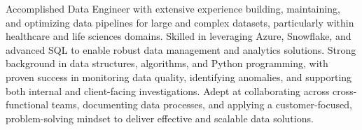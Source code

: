 \begin{onecolentry}
    Accomplished Data Engineer with extensive experience building, maintaining, and optimizing data pipelines for large and complex datasets, particularly within healthcare and life sciences domains. Skilled in leveraging Azure, Snowflake, and advanced SQL to enable robust data management and analytics solutions. Strong background in data structures, algorithms, and Python programming, with proven success in monitoring data quality, identifying anomalies, and supporting both internal and client-facing investigations. Adept at collaborating across cross-functional teams, documenting data processes, and applying a customer-focused, problem-solving mindset to deliver effective and scalable data solutions.
\end{onecolentry}